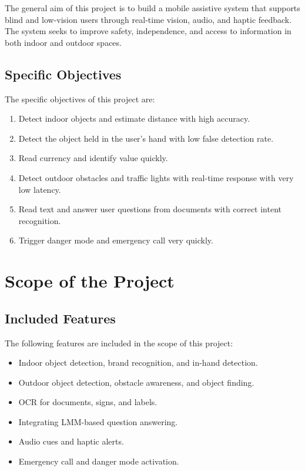 \documentclass[a4paper]{report}
\begin{document}
The general aim of this project is to build a mobile assistive system that supports blind and low-vision users through real-time vision, audio, and haptic feedback. The system seeks to improve safety, independence, and access to information in both indoor and outdoor spaces.

\subsection{Specific Objectives}

The specific objectives of this project are:

\begin{enumerate}[label=\arabic*.]
    \item Detect indoor objects and estimate distance with high accuracy.
    \item Detect the object held in the user's hand with low false detection rate.
    \item Read currency and identify value quickly.
    \item Detect outdoor obstacles and traffic lights with real-time response with very low latency.
    \item Read text and answer user questions from documents with correct intent recognition.
    \item Trigger danger mode and emergency call very quickly.
\end{enumerate}

\section{Scope of the Project}
\label{sec:scope}

\subsection{Included Features}

The following features are included in the scope of this project:

\begin{itemize}
    \item Indoor object detection, brand recognition, and in-hand detection.
    \item Outdoor object detection, obstacle awareness, and object finding.
    \item OCR for documents, signs, and labels.
    \item Integrating LMM-based question answering.
    \item Audio cues and haptic alerts.
    \item Emergency call and danger mode activation.
\end{itemize}
\end{document}
